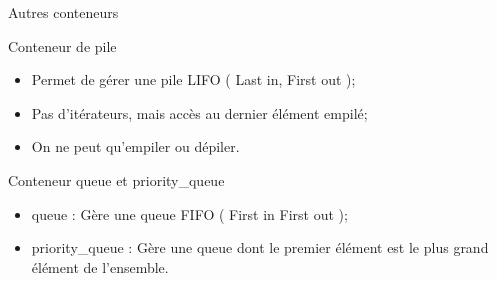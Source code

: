 \documentclass[handout,10pt]{beamer}
\newcommand{\includepartcode}[4][cpp]{

}
\begin{document}
\begin{frame}[fragile]{Autres conteneurs}
\tiny
\begin{block}{Conteneur de pile}
\begin{itemize}
 \item Permet de gérer une pile LIFO ( Last in, First out );
 \item Pas d'itérateurs, mais accès au dernier élément empilé;
 \item On ne peut qu'empiler ou dépiler.
\end{itemize}
\end{block}
\includepartcode{stack.cpp}{7}{12} 	

\begin{block}{Conteneur queue et priority\_queue}
\begin{itemize}
 \item queue : Gère une queue FIFO ( First in First out );
 \item priority\_queue : Gère une queue dont le premier élément est le plus grand élément de l'ensemble.
\end{itemize}
\end{block}
\includepartcode{priority_queue.cpp}{6}{12}
\end{frame}
\end{document}
